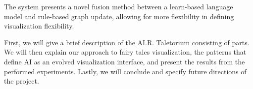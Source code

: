 The system presents a novel fusion method between a learn-based language model and rule-based graph update, allowing for more flexibility in defining visualization flexibility.

First, we will give a brief description of the AI.R. Taletorium consisting of parts. We will then explain our approach to fairy tales visualization, the patterns that define AI as an evolved visualization interface, and present the results from the performed experiments. Lastly, we will conclude and specify future directions of the project.